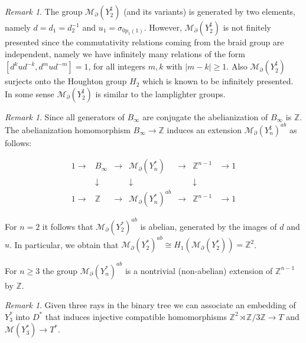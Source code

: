 \documentclass[twoside]{irmaems}
\theoremstyle{plain}
\theoremstyle{definition}
\theoremstyle{remark}
\newtheorem{remark}[theorem]{Remark}
\newcommand{\Z}{{\mathbb{Z}}}
\begin{document}
\begin{remark}
The group ${\mathcal M}_{\partial}(Y_2^{\sharp})$ (and its variants) 
is generated by 
two elements, namely $d=d_1=d_2^{-1}$ and $u_1=\sigma_{0p_1(1)}$. 
However,  ${\mathcal M}_{\partial}(Y_2^{\sharp})$ is not finitely presented  
since the commutativity relations coming from the braid group 
are independent, namely we have infinitely many relations  of the form 
$[d^kud^{-k},d^mud^{-m}]=1$, for all integers $m,k$ with $|m-k|\geq 1$. 
Also  ${\mathcal M}_{\partial}(Y_2^{\sharp})$ surjects onto the 
Houghton group $H_2$  which is known to be infinitely presented. 
In some sense  ${\mathcal M}_{\partial}(Y_2^{\sharp})$ is similar 
to the lamplighter groups. 
\end{remark}

\begin{remark}
Since all generators of $B_{\infty}$ are conjugate 
the abelianization of $B_{\infty}$ is $\Z$. The abelianization 
homomorphism $B_{\infty}\to \Z$ induces an extension 
${\mathcal M}_{\partial}(Y_n^{\sharp})^{ab}$ as follows: 


\[ \begin{array}{ccccccc}
1 \to & B_{\infty} &\to& {\mathcal M}_{\partial}(Y_n^*)&\to &\Z^{n-1}&\to 1\\
      & \downarrow &   &  \downarrow &  & \downarrow & \\ 
1 \to & \Z &\to& {\mathcal M}_{\partial}(Y_n^*)^{ab} &\to &\Z^{n-1}&\to 1
\end{array}
\]
 
\vspace{0.2cm}
\noindent
For $n=2$ it follows that ${\mathcal M}_{\partial}(Y_2^*)^{ab}$ 
is abelian, generated by the images of $d$ and $u$. In particular, we obtain
 that ${\mathcal M}_{\partial}(Y_2^*)^{ab}\cong H_1({\mathcal M}_{\partial}(Y_2^*))=
\Z^2$. 


\vspace{0.2cm}
\noindent
For $n\geq 3$ the group ${\mathcal M}_{\partial}(Y_n^*)^{ab}$ is a nontrivial 
(non-abelian) extension of $\Z^{n-1}$ by $\Z$. 
\end{remark}


\begin{remark}
Given three rays in the binary tree we can associate an embedding 
of $Y_3^{*}$ into $D^*$  that induces injective compatible  homomorphisms
$\Z^2\rtimes \Z/3\Z\to T$ and ${\mathcal M}(Y_3^*)\to T^*$.  
\end{remark}
\end{document}
